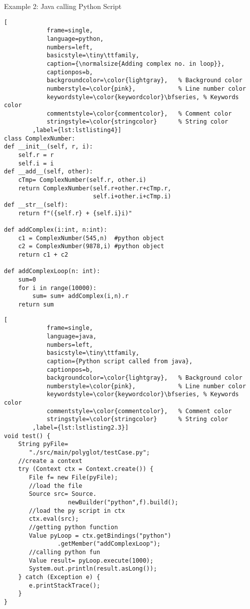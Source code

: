 \begin{frame}[fragile]{Example 2: Java calling Python Script}

    \begin{minipage}[b]{0.45\linewidth}
        \centering
        \begin{lstlisting}[
            frame=single,
            language=python,
            numbers=left,
            basicstyle=\tiny\ttfamily,
            caption={\normalsize{Adding complex no. in loop}},
            captionpos=b,
            backgroundcolor=\color{lightgray},   % Background color
            numberstyle=\color{pink},            % Line number color
            keywordstyle=\color{keywordcolor}\bfseries, % Keywords color
            commentstyle=\color{commentcolor},   % Comment color
            stringstyle=\color{stringcolor}      % String color
        ,label={lst:lstlisting4}]
class ComplexNumber:
def __init__(self, r, i):
    self.r = r
    self.i = i
def __add__(self, other):
    cTmp= ComplexNumber(self.r, other.i)
    return ComplexNumber(self.r+other.r+cTmp.r,
                         self.i+other.i+cTmp.i)
def __str__(self):
    return f"({self.r} + {self.i}i)"

def addComplex(i:int, n:int):
    c1 = ComplexNumber(545,n)  #python object
    c2 = ComplexNumber(9878,i) #python object
    return c1 + c2

def addComplexLoop(n: int):
    sum=0
    for i in range(10000):
        sum= sum+ addComplex(i,n).r
    return sum
        \end{lstlisting}
    \end{minipage}
    \hspace{6mm}
    \begin{minipage}[b]{0.48\linewidth}
        \centering
        \begin{lstlisting}[
            frame=single,
            language=java,
            numbers=left,
            basicstyle=\tiny\ttfamily,
            caption={Python script called from java},
            captionpos=b,
            backgroundcolor=\color{lightgray},   % Background color
            numberstyle=\color{pink},            % Line number color
            keywordstyle=\color{keywordcolor}\bfseries, % Keywords color
            commentstyle=\color{commentcolor},   % Comment color
            stringstyle=\color{stringcolor}      % String color
        ,label={lst:lstlisting2.3}]
void test() {
    String pyFile=
       "./src/main/polyglot/testCase.py";
    //create a context
    try (Context ctx = Context.create()) {
       File f= new File(pyFile);
       //load the file
       Source src= Source.
                  newBuilder("python",f).build();
       //load the py script in ctx
       ctx.eval(src);
       //getting python function
       Value pyLoop = ctx.getBindings("python")
               .getMember("addComplexLoop");
       //calling python fun
       Value result= pyLoop.execute(1000);
       System.out.println(result.asLong());
    } catch (Exception e) {
       e.printStackTrace();
    }
}
        \end{lstlisting}
    \end{minipage}
\end{frame}
